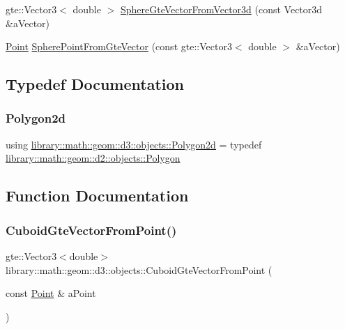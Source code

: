 \begin{DoxyCompactItemize}
\item 
gte\+::\+Vector3$<$ double $>$ \hyperlink{namespacelibrary_1_1math_1_1geom_1_1d3_1_1objects_a45927d15533f5f5dc1a1c4d8b0503d2e}{Sphere\+Gte\+Vector\+From\+Vector3d} (const Vector3d \&a\+Vector)
\item 
\hyperlink{classlibrary_1_1math_1_1geom_1_1d3_1_1objects_1_1_point}{Point} \hyperlink{namespacelibrary_1_1math_1_1geom_1_1d3_1_1objects_af039374e979fbf4b307378cced254d98}{Sphere\+Point\+From\+Gte\+Vector} (const gte\+::\+Vector3$<$ double $>$ \&a\+Vector)
\end{DoxyCompactItemize}


\subsection{Typedef Documentation}
\mbox{\label{namespacelibrary_1_1math_1_1geom_1_1d3_1_1objects_ae339035ccf9a6f4f0d2945fdcfd76f95}} 
\subsubsection{\texorpdfstring{Polygon2d}{Polygon2d}}
{\footnotesize\ttfamily using \hyperlink{namespacelibrary_1_1math_1_1geom_1_1d3_1_1objects_ae339035ccf9a6f4f0d2945fdcfd76f95}{library\+::math\+::geom\+::d3\+::objects\+::\+Polygon2d} = typedef \hyperlink{classlibrary_1_1math_1_1geom_1_1d2_1_1objects_1_1_polygon}{library\+::math\+::geom\+::d2\+::objects\+::\+Polygon}}



\subsection{Function Documentation}
\mbox{\label{namespacelibrary_1_1math_1_1geom_1_1d3_1_1objects_a96c8edec8956345c9f085ef3073f1b3f}} 
\subsubsection{\texorpdfstring{Cuboid\+Gte\+Vector\+From\+Point()}{CuboidGteVectorFromPoint()}}
{\footnotesize\ttfamily gte\+::\+Vector3$<$double$>$ library\+::math\+::geom\+::d3\+::objects\+::\+Cuboid\+Gte\+Vector\+From\+Point (\begin{DoxyParamCaption}\item[{const \hyperlink{classlibrary_1_1math_1_1geom_1_1d3_1_1objects_1_1_point}{Point} \&}]{a\+Point }\end{DoxyParamCaption})}

